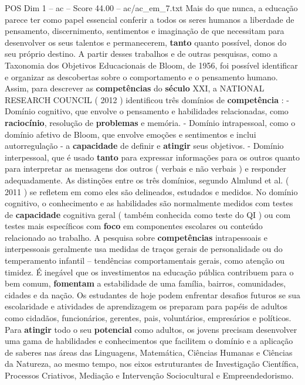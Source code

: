 \begin{textsample}{POS Dim 1 – ac – Score 44.00 – ac/ac\_em\_7.txt}
Mais do que nunca, a educação parece ter como papel essencial conferir a todos os seres humanos a liberdade de pensamento, discernimento, sentimentos e imaginação de que necessitam para desenvolver os seus talentos e permanecerem, \textbf{tanto} quanto possível, donos do seu próprio destino.
A partir desses trabalhos e de outras pesquisas, como a Taxonomia dos Objetivos Educacionais de Bloom, de 1956, foi possível identificar e organizar as descobertas sobre o comportamento e o pensamento humano.
Assim, para descrever as \textbf{competências} do \textbf{século} XXI, a NATIONAL RESEARCH COUNCIL ( 2012 ) identificou três domínios de \textbf{competência} : - Domínio cognitivo, que envolve o pensamento e habilidades relacionadas, como \textbf{raciocínio}, resolução de \textbf{problemas} e memória. - Domínio intrapessoal, como o domínio afetivo de Bloom, que envolve emoções e sentimentos e inclui autorregulação - a \textbf{capacidade} de definir e \textbf{atingir} seus objetivos. - Domínio interpessoal, que é usado \textbf{tanto} para expressar informações para os outros quanto para interpretar as mensagens dos outros ( verbais e não verbais ) e responder adequadamente.
As distinções entre os três domínios, segundo Almlund et al. ( 2011 ) se refletem em como eles são delineados, estudados e medidos.
No domínio cognitivo, o conhecimento e as habilidades são normalmente medidos com testes de \textbf{capacidade} cognitiva geral ( também conhecida como teste do QI ) ou com testes mais específicos com \textbf{foco} em componentes escolares ou conteúdo relacionado ao trabalho.
A pesquisa sobre \textbf{competências} intrapessoais e interpessoais geralmente usa medidas de traços gerais de personalidade ou do temperamento infantil – tendências comportamentais gerais, como atenção ou timidez.
É inegável que os investimentos na educação pública contribuem para o bem comum, \textbf{fomentam} a estabilidade de uma família, bairros, comunidades, cidades e da nação.
Os estudantes de hoje podem enfrentar desafios futuros se sua escolaridade e atividades de aprendizagem os preparam para papéis de adultos como cidadãos, funcionários, gerentes, pais, voluntários, empresários e políticos.
Para \textbf{atingir} todo o seu \textbf{potencial} como adultos, os jovens precisam desenvolver uma gama de habilidades e conhecimentos que facilitem o domínio e a aplicação de saberes nas áreas das Linguagens, Matemática, Ciências Humanas e Ciências da Natureza, ao mesmo tempo, nos eixos estruturantes de Investigação Científica, Processos Criativos, Mediação e Intervenção Sociocultural e Empreendedorismo.

\end{textsample}
